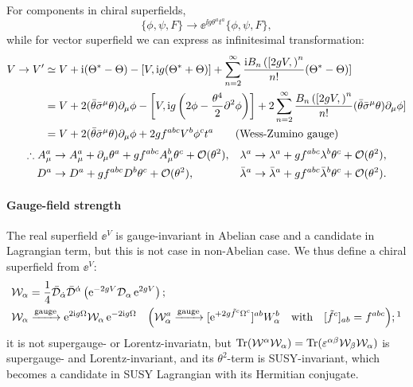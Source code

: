 \documentclass[CheatSheet]{subfiles}
\newcommand{\OD}{{\mathcal D}}
\begin{document}
For components in chiral superfields,
\begin{equation}
   \{\phi,\psi,F\}\to \ee^{\ii g \theta^at^a}\{\phi,\psi,F\},
\end{equation}
while for vector superfield we can express as infinitesimal transformation:
\begin{align}
 V\to V'
&\simeq
V + \mathrm{i} (\Theta^*-\Theta)
 - [V,\mathrm{i} g(\Theta^*+\Theta)]+
 \sum_{n=2}^{\infty}\frac{\mathrm{i} B_n\left([2gV,\right)^n}{n!} (\Theta^*-\Theta)]
\\&=
V +2(\bar\theta\bar\sigma^{\mu}\theta)\partial_{\mu}\phi
 - \left[V,\mathrm{i} g\left(2\phi-\frac{\theta^4}2\partial^2\phi\right)\right]
 +2\sum_{n=2}^{\infty}\frac{B_n\left([2gV,\right)^n}{n!}(\bar\theta\bar\sigma^{\mu}\theta)\partial_{\mu}\phi]
\\&=
V +2(\bar\theta\bar\sigma^{\mu}\theta)\partial_{\mu}\phi
 +2 g f^{abc}V^b\phi^ct^a
\qquad\text{(Wess-Zumino gauge)}
\end{align}
\begin{equation}
\begin{split}
   \therefore A_\mu^a&\to A^a_\mu+\partial_\mu \theta^a
   + g f^{abc}A_\mu^b\theta^c  + \operatorname{\mathcal{O}}(\theta^2),
 &\lambda^a&\to\lambda^a+gf^{abc}\lambda^b\theta^c+\operatorname{\mathcal{O}}(\theta^2),
 \\
 D^a&\to D^a+gf^{abc}D^b\theta^c+\operatorname{\mathcal{O}}(\theta^2),
& \bar\lambda^a&\to\bar\lambda^a+gf^{abc}\bar\lambda^b\theta^c + \operatorname{\mathcal{O}}(\theta^2).
\end{split}
\end{equation}
\paragraph{Gauge-field strength}
The real superfield $\ee^{V}$ is gauge-invariant in Abelian case and a candidate in Lagrangian term, but this is not case in non-Abelian case.
We thus define a chiral superfield from $\ee^{V}$:
\begin{align}
& \mathcal W_\alpha = \frac14\bar\OD_\dalpha\bar\OD^\dalpha\left(\ee^{-2gV}\OD_\alpha\ee^{2gV}\right);\\
&\mathcal W_\alpha\xrightarrow{\text{gauge}}
\ee^{2\ii g \Omega}\mathcal W_{\alpha}\ee^{-2\ii g \Omega}
\quad
\Bigl(
\mathcal W_\alpha^a\xrightarrow{\text{gauge}}[\ee^{+2g \tilde f^c \Omega^c}]^{ab}W_\alpha^b
\text{\quad with\quad$[\tilde f^c]_{ab}=f^{abc}$}
\Bigr);\footnotemark
\end{align}%
%
it is not supergauge- or Lorentz-invariatn, but $\operatorname{\mathrm{Tr}}(\mathcal W^\alpha \mathcal W_\alpha) = \operatorname{\mathrm{Tr}}(\varepsilon^{\alpha\beta}\mathcal W_\beta \mathcal W_\alpha)$ is supergauge- and Lorentz-invariant, and its $\theta^2$-term is SUSY-invariant, which becomes a candidate in SUSY Lagrangian with its Hermitian conjugate.
\end{document}
